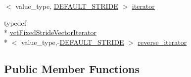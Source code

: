 \begin{DoxyCompactItemize}
$<$ value\-\_\-type, \hyperlink{classvct_dynamic_vector_owner_aa8a4c610d62931e2fa3374a05e4ae56ca4925b2613604288a5936bd34e22b6a9f}{D\-E\-F\-A\-U\-L\-T\-\_\-\-S\-T\-R\-I\-D\-E} $>$ \hyperlink{classvct_dynamic_vector_owner_a0ef55f887d1340204d64f21d4db08fad}{iterator}
\item 
typedef \\*
\hyperlink{classvct_fixed_stride_vector_iterator}{vct\-Fixed\-Stride\-Vector\-Iterator}\\*
$<$ value\-\_\-type,-\/\hyperlink{classvct_dynamic_vector_owner_aa8a4c610d62931e2fa3374a05e4ae56ca4925b2613604288a5936bd34e22b6a9f}{D\-E\-F\-A\-U\-L\-T\-\_\-\-S\-T\-R\-I\-D\-E} $>$ \hyperlink{classvct_dynamic_vector_owner_a963d655b94fe07a9c7abbee2705005d1}{reverse\-\_\-iterator}
\end{DoxyCompactItemize}
\subsection*{Public Member Functions}
